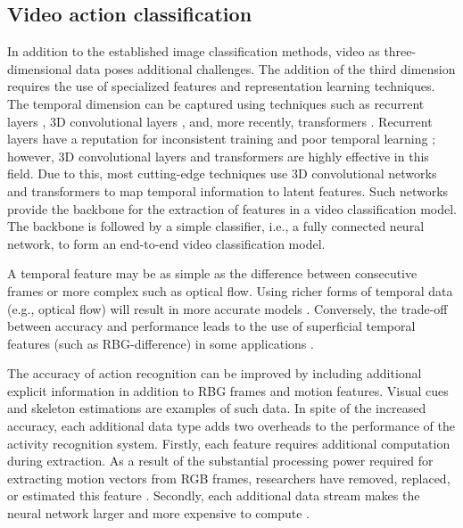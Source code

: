 \documentclass[review]{elsarticle}
\begin{document}
\subsection{Video action classification}

In addition to the established image classification methods, video as three-dimensional data poses additional challenges. The addition of the third dimension requires the use of specialized features and representation learning techniques\citep{hara2017learning, wang2018human, nazir2018evaluating}. The temporal dimension can be captured using techniques such as recurrent layers  \citep{liu2016spatio, ullah2017action, majd2020correlational, liu2017global}, 3D convolutional layers \citep{ji20123d, yang2019asymmetric, zhou2018mict, hara2017learning}, and, more recently, transformers \citep{plizzari2021spatial, li2021trear, mazzia2021action, girdhar2019video}. Recurrent layers have a reputation for inconsistent training and poor temporal learning \citep{vaswani2017attention}; however, 3D convolutional layers and transformers are highly effective in this field. Due to this, most cutting-edge techniques use 3D convolutional networks and transformers to map temporal information to latent features. Such networks provide the backbone for the extraction of features in a video classification model. The backbone is followed by a simple classifier, i.e., a fully connected neural network, to form an end-to-end video classification model.

A temporal feature may be as simple as the difference between consecutive frames or more complex such as optical flow. Using richer forms of temporal data (e.g., optical flow) will result in more accurate models \citep{sevilla2018integration, sun2018optical}. Conversely, the trade-off between accuracy and performance leads to the use of superficial temporal features (such as RBG-difference) in some applications \citep{zhang2016rgb, hu2018deep, crasto2019mars, wang2018cooperative}.

The accuracy of action recognition can be improved by including additional explicit information in addition to RBG frames and motion features. Visual cues \citep{tu2018semantic, wang2016mofap} and skeleton estimations \citep{yan2018spatial, plizzari2021spatial, shi2019skeleton} are examples of such data. In spite of the increased accuracy, each additional data type adds two overheads to the performance of the activity recognition system. Firstly, each feature requires additional computation during extraction. As a result of the substantial processing power required for extracting motion vectors from RGB frames, researchers have removed, replaced, or estimated this feature \citep{sun2018optical, wang2013action}. Secondly, each additional data stream makes the neural network larger and more expensive to compute \citep{simonyan2014two}.
\end{document}

